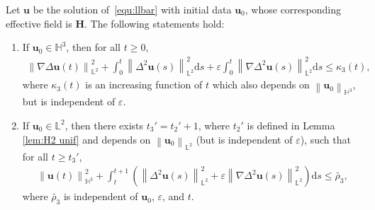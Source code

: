 \documentclass[10pt,a4paper]{amsart}
\newcommand{\bb}{\mathbb}
\newcommand{\bff}{\boldsymbol}
\newcommand{\ds}{\mathrm{d}s}
\newcommand{\norm}[2]{\left\|{#1}\right\|_{#2}}
\begin{document}
\begin{lemma}\label{lem:H3 unif}
Let $\bff{u}$ be the solution of~\eqref{equ:llbar} with initial data $\bff{u}_0$, whose corresponding effective field is $\bff{H}$. The following statements hold:
\begin{enumerate}
\item If $\bff{u}_0\in\bb{H}^3$, then for all $t\geq 0$,
\begin{align}\label{equ:et3 H3}
    \norm{\nabla \Delta \bff{u}(t)}{\bb{L}^2}^2
    +
    \int_0^t \norm{\Delta^2 \bff{u}(s)}{\bb{L}^2}^2 \ds 
    +
    \varepsilon \int_0^t \norm{\nabla \Delta^2 \bff{u}(s)}{\bb{L}^2}^2 \ds 
    \leq
    \kappa_3(t),
\end{align}
where $\kappa_3(t)$ is an increasing function of $t$ which also depends on $\norm{\bff{u}_0}{\bb{H}^3}$, but is independent of $\varepsilon$.
\item If $\bff{u}_0\in \bb{L}^2$, then there exists $t_3'=t_2'+1$, where $t_2'$ is defined in Lemma \ref{lem:H2 unif} and depends on $\norm{\bff{u}_0}{\bb{L}^2}$ (but is independent of $\varepsilon$), such that for all $t\geq t_3'$,
\begin{align}\label{equ:tt1 H3}
    \norm{\bff{u}(t)}{\bb{H}^3}^2 
    +
    \int_t^{t+1} \left( \norm{\Delta^2 \bff{u}(s)}{\bb{L}^2}^2 + \varepsilon \norm{\nabla \Delta^2 \bff{u}(s)}{\bb{L}^2}^2 \right) \ds
    \leq
    \widetilde{\rho_3},
\end{align}
where $\widetilde{\rho_3}$ is independent of $\bff{u}_0$, $\varepsilon$, and $t$.
\end{enumerate}
\end{lemma}
\end{document}
